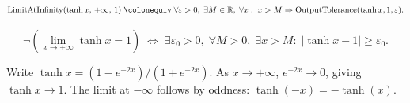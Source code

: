 \begin{remark*}
\[
  \operatorname{LimitAtInfinity}(\tanh x,\,+\infty,\,1)
  \;\colonequiv\;
  \forall\varepsilon>0,\;\exists M\in\mathbb{R},\;\forall x:\;
  x>M \Rightarrow \operatorname{OutputTolerance}(\tanh x,1,\varepsilon).
\]
\end{remark*}

\begin{remark*}
\[
  \neg\left(\lim_{x\to+\infty}\tanh x=1\right)
  \;\iff\;
  \exists\varepsilon_0>0,\;\forall M>0,\;\exists x>M:\;
  |\tanh x - 1|\geq\varepsilon_0.
\]
\end{remark*}

\begin{remark*}
Write $\tanh x = (1 - e^{-2x})/(1 + e^{-2x})$. As $x \to +\infty$,
$e^{-2x} \to 0$, giving $\tanh x \to 1$. The limit at $-\infty$
follows by oddness: $\tanh(-x) = -\tanh(x)$.
\end{remark*}


